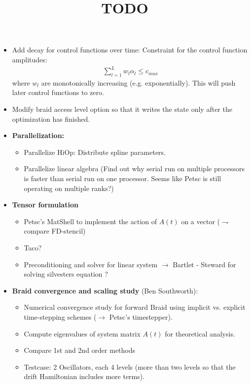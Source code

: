 \documentclass{article}
\title{TODO}
\begin{document}
\maketitle

\begin{itemize}
  \item Add decay for control functions over time: Constraint for the control function amplitudes:
      \begin{align*}
          \sum_{l=1}^L w_l\alpha_l \leq c_{max}
      \end{align*}
        where $w_l$ are monotonically increasing (e.g. exponentially). This will push later control functions to zero. 
  \item Modify braid access level option so that it writes the state only after the optimization has finished. 
  \item \textbf{Parallelization:}
      \begin{itemize}
        \item Parallelize HiOp: Distribute spline parameters.
        \item Parallelize linear algebra (Find out why serial run on multiple processors is faster than serial run on one processor. Seems like Petsc is still operating on multiple ranks?)
      \end{itemize}
  \item \textbf{Tensor formulation}
        \begin{itemize}
          \item Petsc's MatShell to implement the action of $A(t)$ on a vector ($\rightharpoondown$ compare FD-stencil)
          \item Taco?
          \item Preconditioning and solver for linear system $\rightarrow$ Bartlet - Steward for solving silvesters equation ?
        \end{itemize}
  \item \textbf{Braid convergence and scaling study} (Ben Southworth):
        \begin{itemize}
          \item Numerical convergence study for forward Braid using implicit vs. explicit time-stepping schemes ($\rightarrow$ Petsc's timestepper).
          \item Compute eigenvalues of system matrix $A(t)$ for theoretical analysis. 
          \item Compare 1st and 2nd order methods
          \item Testcase: 2 Oscillators, each 4 levels (more than two levels so that the drift Hamiltonian includes more terms). 

\end{itemize}
\end{itemize}
\end{document}

